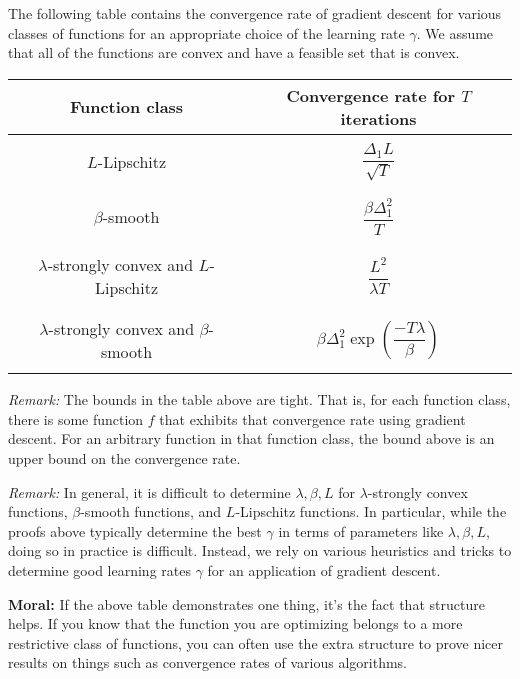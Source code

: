 \documentclass[12pt]{report}
\begin{document}
The following table contains the convergence rate of gradient descent for various classes of functions for an appropriate choice of the learning rate $\gamma$. We assume that all of the functions are convex and have a feasible set that is convex.

\begin{center}
	\begin{tabular}{ c | c }
		\hline
		{\bf Function class} & {\bf Convergence rate for $T$ iterations}\\
		\hline
		\\ 
		$L$-Lipschitz & $\dfrac{\Delta_1 L}{\sqrt{T}}$\\
		\\
		\hline
		\\
		$\beta$-smooth & $\dfrac{\beta\Delta_1^2}{T}$\\
		\\
		\hline
		\\
		$\lambda$-strongly convex and $L$-Lipschitz & $\dfrac{L^2}{\lambda T}$ \\ 
		\\
		\hline
		\\
		$\lambda$-strongly convex and $\beta$-smooth & $\beta\Delta_1^2\exp(\dfrac{-T\lambda}{\beta})$\\
		\\
		\hline
	\end{tabular}
\end{center}

{\it Remark:} The bounds in the table above are tight. That is, for each function class, there is some function $f$ that exhibits that convergence rate using gradient descent. For an arbitrary function in that function class, the bound above is an upper bound on the convergence rate.

\medskip

{\it Remark:} In general, it is difficult to determine $\lambda, \beta, L$ for $\lambda$-strongly convex functions, $\beta$-smooth functions, and $L$-Lipschitz functions. In particular, while the proofs above typically determine the best $\gamma$ in terms of parameters like $\lambda, \beta, L$, doing so in practice is difficult. Instead, we rely on various heuristics and tricks to determine good learning rates $\gamma$ for an application of gradient descent.

\medskip

{\bf Moral:} If the above table demonstrates one thing, it's the fact that structure helps. If you know that the function you are optimizing belongs to a more restrictive class of functions, you can often use the extra structure to prove nicer results on things such as convergence rates of various algorithms.
\end{document}
